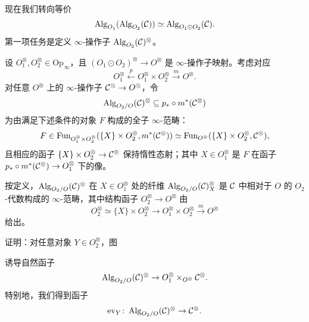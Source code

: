 \nitem\label{L26-3.1} 现在我们转向等价
\[
\operatorname{Alg}_{O_{1}}(\operatorname{Alg}_{O_{2}}(\mathcal{C}))\simeq\operatorname{Alg}_{O_{1}\odot O_{2}}(\mathcal{C}).
\]
第一项任务是定义 $\infty$-操作子 $\operatorname{Alg}_{O_{2}}(\mathcal{C})^{\otimes}$。

\begin{construction}\label{L26-3.2}
设 $O_{1}^{\otimes},O_{2}^{\otimes}\in\mathrm{Op}_{\infty}$，且 $(O_{1}\odot O_{2})^{\otimes}\to O^{\otimes}$ 是 $\infty$-操作子映射。考虑对应
\[
O_{1}^{\otimes}\xleftarrow{p}O_{1}^{\otimes}\times O_{2}^{\otimes}\xrightarrow{m}O^{\otimes}.
\]
对任意 $O^{\otimes}$ 上的 $\infty$-操作子 $\mathcal{C}^{\otimes}\to O^{\otimes}$，令
\[
\operatorname{Alg}_{O_{2}/O}(\mathcal{C})^{\otimes}\subseteq p_{*}\circ m^{*}(\mathcal{C}^{\otimes})
\]
为由满足下述条件的对象 $F$ 构成的全子 $\infty$-范畴：
\[
F\in\operatorname{Fun}_{O_{1}^{\otimes}\times O_{2}^{\otimes}}(\{X\}\times O_{2}^{\otimes},m^{*}(\mathcal{C}^{\otimes}))\simeq\operatorname{Fun}_{O^{\otimes}}(\{X\}\times O_{2}^{\otimes},\mathcal{C}^{\otimes}),
\]
且相应的函子 $\{X\}\times O_{2}^{\otimes}\to\mathcal{C}^{\otimes}$ 保持惰性态射；其中 $X\in O_{1}^{\otimes}$ 是 $F$ 在函子 $p_{*}\circ m^{*}(\mathcal{C}^{\otimes})\to O_{1}^{\otimes}$ 下的像。
\end{construction}

\begin{remark}\label{L26-3.3}
按定义，$\operatorname{Alg}_{O_{2}/O}(\mathcal{C})^{\otimes}$ 在 $X\in O_{1}^{\otimes}$ 处的纤维 $\operatorname{Alg}_{O_{2}/O}(\mathcal{C})^{\otimes}_{X}$ 是 $\mathcal{C}$ 中相对于 $O$ 的 $O_{2}$-代数构成的 $\infty$-范畴，其中结构函子 $O_{2}^{\otimes}\to O^{\otimes}$ 由
\[
O_{2}^{\otimes}\simeq\{X\}\times O_{2}^{\otimes}\to O_{1}^{\otimes}\times O_{2}^{\otimes}\xrightarrow{m}O^{\otimes}
\]
给出。
\end{remark}

\begin{exercise}\label{L26-3.4}
证明：对任意对象 $Y\in O_{2}^{\otimes}$，图
\begin{center}
\end{center}
诱导自然函子
\[
\operatorname{Alg}_{O_{2}/O}(\mathcal{C})^{\otimes}\to O_{1}^{\otimes}\times_{O^{\otimes}}\mathcal{C}^{\otimes}.
\]
特别地，我们得到函子
\[
\mathrm{ev}_{Y}\colon\operatorname{Alg}_{O_{2}/O}(\mathcal{C})^{\otimes}\to\mathcal{C}^{\otimes}.
\]
\end{exercise}

